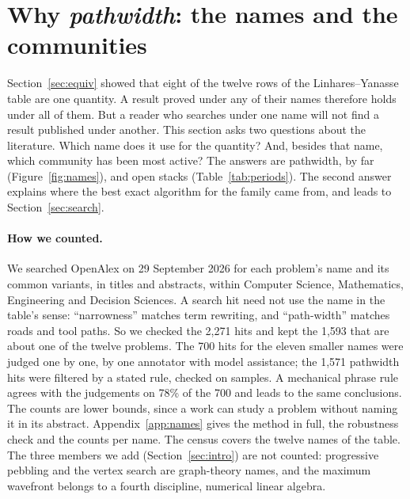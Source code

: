 \section{Why \emph{pathwidth}: the names and the communities}
\label{sec:names}

Section~\ref{sec:equiv} showed that eight of the twelve rows of the
Linhares--Yanasse table are one quantity. A result proved under any of their
names therefore holds under all of them. But a reader who searches under one
name will not find a result published under another. This section asks two
questions about the literature. Which name does it use for the quantity? And,
besides that name, which community has been most active? The answers are
pathwidth, by far (Figure~\ref{fig:names}), and open stacks
(Table~\ref{tab:periods}). The second answer explains where the best
exact algorithm for the family came from, and leads to Section~\ref{sec:search}.

\paragraph{How we counted.} We searched OpenAlex \citep{Priem2022} on
29 September 2026 for each problem's name and its common variants, in titles and
abstracts, within Computer Science, Mathematics, Engineering and Decision
Sciences. A search hit need not use the name in the table's sense: ``narrowness''
matches term rewriting, and ``path-width'' matches roads and tool paths. So we checked the 2,271 hits and kept the 1,593 that are about one of the twelve problems.
The 700 hits for the eleven smaller names were judged one by one, by one
annotator with model assistance; the 1,571 pathwidth hits were filtered by a
stated rule, checked on samples. A mechanical phrase rule agrees with the
judgements on 78\% of the 700 and leads to the same conclusions. The counts are
lower bounds, since a work can study a problem without naming it in its
abstract. Appendix~\ref{app:names} gives the method in full, the robustness
check and the counts per name. The census covers the twelve names of the
table. The three members we add (Section~\ref{sec:intro}) are not counted:
progressive pebbling and the vertex search are graph-theory names, and the
maximum wavefront belongs to a fourth discipline, numerical linear algebra.

